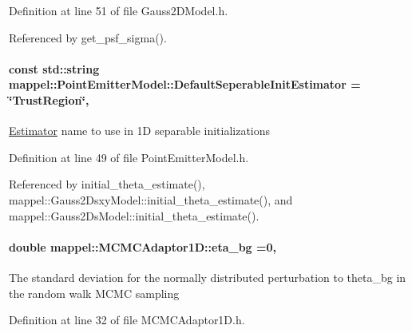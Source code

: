 Definition at line 51 of file Gauss2\+D\+Model.\+h.



Referenced by get\+\_\+psf\+\_\+sigma().

\paragraph[{\texorpdfstring{Default\+Seperable\+Init\+Estimator}{DefaultSeperableInitEstimator}}]{\setlength{\rightskip}{0pt plus 5cm}const std\+::string mappel\+::\+Point\+Emitter\+Model\+::\+Default\+Seperable\+Init\+Estimator = \char`\"{}Trust\+Region\char`\"{}\hspace{0.3cm}{\ttfamily [static]}, {\ttfamily [inherited]}}\hypertarget{classmappel_1_1PointEmitterModel_ad8c3dc629d75d22f25855a5f1ba8729f}{}\label{classmappel_1_1PointEmitterModel_ad8c3dc629d75d22f25855a5f1ba8729f}
\hyperlink{classmappel_1_1Estimator}{Estimator} name to use in 1D separable initializations 

Definition at line 49 of file Point\+Emitter\+Model.\+h.



Referenced by initial\+\_\+theta\+\_\+estimate(), mappel\+::\+Gauss2\+Dsxy\+Model\+::initial\+\_\+theta\+\_\+estimate(), and mappel\+::\+Gauss2\+Ds\+Model\+::initial\+\_\+theta\+\_\+estimate().

\paragraph[{\texorpdfstring{eta\+\_\+bg}{eta_bg}}]{\setlength{\rightskip}{0pt plus 5cm}double mappel\+::\+M\+C\+M\+C\+Adaptor1\+D\+::eta\+\_\+bg =0\hspace{0.3cm}{\ttfamily [protected]}, {\ttfamily [inherited]}}\hypertarget{classmappel_1_1MCMCAdaptor1D_af54c93421b8e298289cbb92743c6b3d5}{}\label{classmappel_1_1MCMCAdaptor1D_af54c93421b8e298289cbb92743c6b3d5}
The standard deviation for the normally distributed perturbation to theta\+\_\+bg in the random walk M\+C\+MC sampling 

Definition at line 32 of file M\+C\+M\+C\+Adaptor1\+D.\+h.



